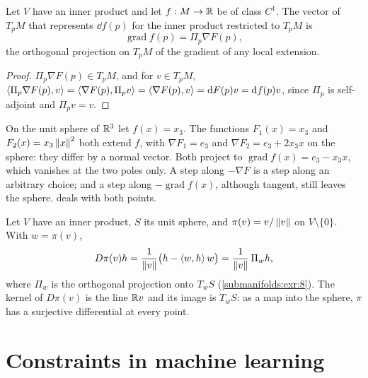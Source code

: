 \begin{notechapter}
\begin{proposition}
\label{submanifolds:prop:gradient}
Let $V$ have an inner product and let $f:M\to\mathbb{R}$ be of class $C^1$. The
vector of $T_pM$ that represents $\dd f(p)$ for the inner product
restricted to $T_pM$ is
\[
  \operatorname{grad}f(p) = \Pi_p\nabla F(p) ,
\]
the orthogonal projection on $T_pM$ of the gradient of any local
extension.
\end{proposition}

\begin{proof}
$\Pi_p\nabla F(p)\in T_pM$, and for $v\in T_pM$,
$\left\langle \Pi_p\nabla F(p), v \right\rangle = \left\langle \nabla F(p), \Pi_pv \right\rangle
= \left\langle \nabla F(p), v \right\rangle = \mathrm{d} F(p)v = \mathrm{d} f(p)v$, since $\Pi_p$ is
self-adjoint and $\Pi_pv = v$.
\end{proof}

\begin{pitfall}
On the unit sphere of $\mathbb{R}^3$ let $f(x) = x_3$. The functions
$F_1(x) = x_3$ and $F_2(x) = x_3\left\|x\right\|^2$ both extend $f$, with
$\nabla F_1 = e_3$ and $\nabla F_2 = e_3 + 2x_3x$ on the sphere: they
differ by a normal vector. Both project to
$\operatorname{grad}f(x) = e_3 - x_3x$, which vanishes at the two poles
only. A step along $-\nabla F$ is a step along an arbitrary choice; and a
step along $-\operatorname{grad}f(x)$, although tangent, still leaves the
sphere.  deals with both points.
\end{pitfall}

\begin{example}[Normalization]\label{submanifolds:ex:normalization}
Let $V$ have an inner product, $S$ its unit sphere, and
$\pi(v) = v/\left\|v\right\|$ on $V\setminus\{0\}$. With $w = \pi(v)$,
\[
  D\pi(v)h = \frac1{\left\|v\right\|}\bigl(h - \left\langle w, h \right\rangle w\bigr)
  = \frac1{\left\|v\right\|}\,\Pi_wh ,
\]
where $\Pi_w$ is the orthogonal projection onto $T_wS$
(\cref{submanifolds:exr:8}). The kernel of $D\pi(v)$ is the line $\mathbb{R} v$
and its image is $T_wS$: as a map into the sphere, $\pi$ has a surjective
differential at every point.
\end{example}

\section{Constraints in machine learning}\label{submanifolds:sec:ml}


\end{notechapter}
